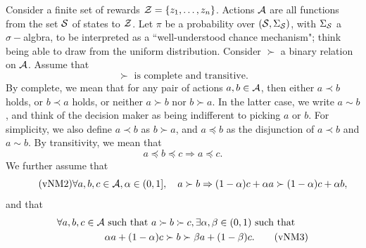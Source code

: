 \documentclass{article}
\begin{document}
Consider a finite set of rewards $\mathcal{Z} = \{z_1, \dots, z_n\}$.
Actions $\mathcal{A}$ are all functions from the set $\mathcal{S}$ of states to $\mathcal{Z}$.
Let $\pi$ be a probability over $(\mathcal{S}, \Sigma_{\mathcal{S}})$, with $\Sigma_{\mathcal{S}}$ a $\sigma-$algbra, to be interpreted as a ``well-understood chance mechanism"; think being able to draw from the uniform distribution.
Consider $\succ$ a binary relation on $\mathcal{A}$.
Assume that
\begin{equation}
  \label{e:vnm1} 
  \tag{vNM1}
  \succ \text{ is complete and transitive}.
\end{equation}
By complete, we mean that for any pair of actions $a,b\in \mathcal{A}$, then either $a\prec b$ holds, or $b\prec a$ holds, or neither $a\succ b$ nor $b\succ a$. 
In the latter case, we write $a\sim b$, and think of the decision maker as being indifferent to picking $a$ or $b$.
For simplicity, we also define $a\prec b$ as $b\succ a$, and $a\preceq b$ as the disjunction of $a\prec b$ and $a\sim b$. 
By transitivity, we mean that 
$$
a\preceq b \preceq c \Rightarrow a\preceq c.
$$
We further assume that 
\begin{equation}
  \label{e:vnm2}
  \tag{vNM2}
  \forall a, b, c\in \mathcal{A}, \alpha\in (0,1], \quad a\succ b \Rightarrow (1-\alpha)c + \alpha a\succ (1-\alpha)c + \alpha b,
\end{equation}
and that
\begin{align}
  \forall a, b, c\in \mathcal{A} & \text{ such that } a\succ b\succ c, \exists \alpha, \beta\in(0,1)\text{ such that } \nonumber\\
  & \alpha a + (1-\alpha) c \succ b \succ \beta a + (1-\beta) c.
  \label{e:vnm3}
  \tag{vNM3}
\end{align}
\end{document}
